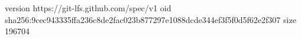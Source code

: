 version https://git-lfs.github.com/spec/v1
oid sha256:9cec943335ffa236c8de2fac023b877297e1088dcde344ef3f5f0d5f62e2f307
size 196704
